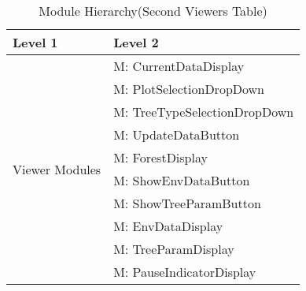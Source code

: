 \documentclass[12pt, titlepage]{article}
\newcounter{mnum}
\newcommand{\mthemnum}{M\themnum}
\begin{document}
\begin{table}[H]
\caption{Module Hierarchy(Second Viewers Table)}
\label{TblViewers2}

\centering
\begin{tabular}{p{} p{}}
\toprule
\textbf{Level 1} & \textbf{Level 2}\\
\midrule

\multirow{10}{0.3\textwidth}{Viewer Modules}
& {mnum} \mthemnum \label{Viwer14}: CurrentDataDisplay \\
& {mnum} \mthemnum \label{Viwer15}: PlotSelectionDropDown \\
& {mnum} \mthemnum \label{Viwer16}: TreeTypeSelectionDropDown \\
& {mnum} \mthemnum \label{Viwer17}: UpdateDataButton \\
& {mnum} \mthemnum \label{Viwer18}: ForestDisplay \\
& {mnum} \mthemnum \label{Viwer19}: ShowEnvDataButton \\
& {mnum} \mthemnum \label{Viwer20}: ShowTreeParamButton \\
& {mnum} \mthemnum \label{Viwer21}: EnvDataDisplay \\
& {mnum} \mthemnum \label{Viwer22}: TreeParamDisplay \\
& {mnum} \mthemnum \label{Viwer23}: PauseIndicatorDisplay \\
\bottomrule
\end{tabular}
\end{table}

\newpage
\end{document}
